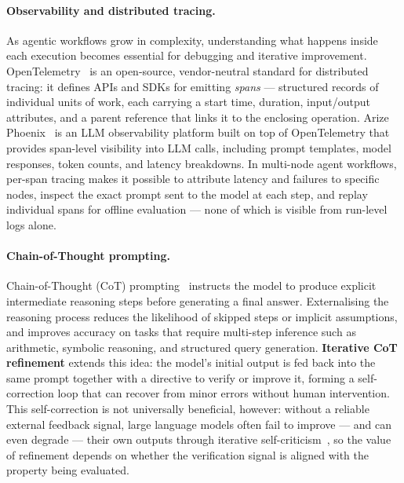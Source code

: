 \paragraph{Observability and distributed tracing.}
As agentic workflows grow in complexity, understanding what happens inside each
execution becomes essential for debugging and iterative improvement.
OpenTelemetry~\cite{opentelemetry} is an open-source, vendor-neutral standard
for distributed tracing: it defines APIs and SDKs for emitting \textit{spans}
— structured records of individual units of work, each carrying a start time,
duration, input/output attributes, and a parent reference that links it to the
enclosing operation.
Arize Phoenix~\cite{arize_phoenix} is an LLM observability platform built on
top of OpenTelemetry that provides span-level visibility into LLM calls,
including prompt templates, model responses, token counts, and latency
breakdowns.
In multi-node agent workflows, per-span tracing makes it possible to attribute
latency and failures to specific nodes, inspect the exact prompt sent to the
model at each step, and replay individual spans for offline evaluation — none
of which is visible from run-level logs alone.

\paragraph{Chain-of-Thought prompting.}
Chain-of-Thought (CoT) prompting~\cite{wei2022chain} instructs the model to
produce explicit intermediate reasoning steps before generating a final answer.
Externalising the reasoning process reduces the likelihood of skipped steps
or implicit assumptions, and improves accuracy on tasks that require multi-step
inference such as arithmetic, symbolic reasoning, and structured query
generation.
\textbf{Iterative CoT refinement} extends this idea: the model's initial output is fed
back into the same prompt together with a directive to verify or improve it,
forming a self-correction loop that can recover from minor errors without
human intervention. This self-correction is not universally beneficial,
however: without a reliable external feedback signal, large language models
often fail to improve --- and can even degrade --- their own outputs through
iterative self-criticism~\cite{huang2024selfcorrect}, so the value of
refinement depends on whether the verification signal is aligned with the
property being evaluated.

